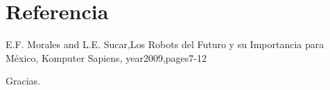 \documentclass[12pt,a4paper]{report}
\begin{document}
\section{Referencia}

  E.F. Morales and L.E. Sucar,Los Robots del Futuro y su Importancia para M\'exico, Komputer Sapiens,
  year{2009},pages{7-12}








\begin{center}
Gracias.
\end{center}
\end{document}
